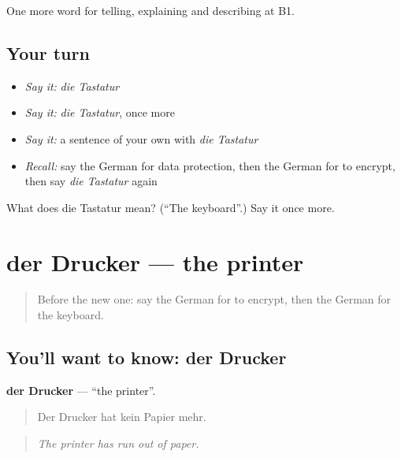 \begin{grammarlens}[title={What you've built}]
One more word for telling, explaining and describing at B1.
\end{grammarlens}

\subsection*{Your turn}
\begin{itemize}
\raggedright
  \item \emph{Say it:} \emph{die Tastatur}
  \item \emph{Say it:} \emph{die Tastatur}, once more
  \item \emph{Say it:} a sentence of your own with \emph{die Tastatur}
  \item \emph{Recall:} say the German for data protection, then the German for to encrypt, then say \emph{die Tastatur} again
\end{itemize}

\begin{tcolorbox}[breakable,colback=teal!4,colframe=teal!35!black,title={Before you move on}]
What does die Tastatur mean? (\textquotedblleft{}The keyboard\textquotedblright{}.) Say it once more.
\end{tcolorbox}
\section[der Drucker]{der Drucker — the printer}

\label{lesson:GE-C396-drucker}



\begin{quote}
Before the new one: say the German for to encrypt, then the German for the keyboard.
\end{quote}

\subsection*{You'll want to know: der Drucker}
\textbf{der Drucker} — \textquotedblleft{}the printer\textquotedblright{}.

\begin{quote}
Der Drucker hat kein Papier mehr.
\end{quote}

\begin{quote}
\emph{The printer has run out of paper.}
\end{quote}

